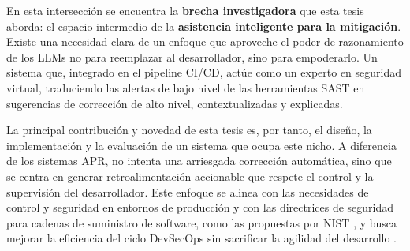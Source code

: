 En esta intersección se encuentra la \textbf{brecha investigadora} que esta tesis aborda: el espacio intermedio de la \textbf{asistencia inteligente para la mitigación}. Existe una necesidad clara de un enfoque que aproveche el poder de razonamiento de los LLMs no para reemplazar al desarrollador, sino para empoderarlo. Un sistema que, integrado en el pipeline CI/CD, actúe como un experto en seguridad virtual, traduciendo las alertas de bajo nivel de las herramientas SAST en sugerencias de corrección de alto nivel, contextualizadas y explicadas.

La principal contribución y novedad de esta tesis es, por tanto, el diseño, la implementación y la evaluación de un sistema que ocupa este nicho. A diferencia de los sistemas APR, no intenta una arriesgada corrección automática, sino que se centra en generar retroalimentación accionable que respete el control y la supervisión del desarrollador. Este enfoque se alinea con las necesidades de control y seguridad en entornos de producción y con las directrices de seguridad para cadenas de suministro de software, como las propuestas por NIST \cite{NIST2024CICDSecurity}, y busca mejorar la eficiencia del ciclo DevSecOps sin sacrificar la agilidad del desarrollo \cite{Laukkanen2017BenefitsChallengesCICD, Myrbakken2019DevSecOpsSLR}.